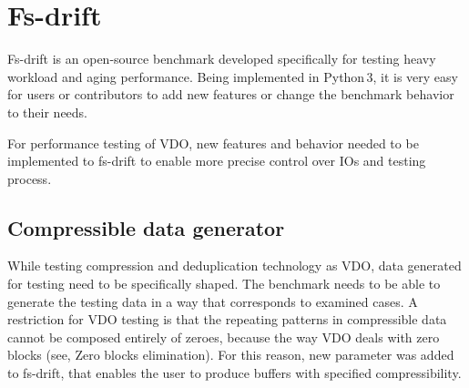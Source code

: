 \documentclass[
  color, %
  table, %
  lof,   %
  lot,   %
]{fithesis3}
\begin{document}



\chapter{Fs-drift}
\label{fs-drift}

Fs-drift is an open-source benchmark developed specifically for testing heavy workload and aging performance. Being implemented in Python\,3, it is very easy for users or contributors to add new features or change the benchmark behavior to their needs.

For performance testing of VDO, new features and behavior needed to be implemented to fs-drift to enable more precise control over IOs and testing process.

\section{Compressible data generator}
While testing compression and deduplication technology as VDO, data generated for testing need to be specifically shaped. The benchmark needs to be able to generate the testing data in a way that corresponds to examined cases. A restriction for VDO testing is that the repeating patterns in compressible data cannot be composed entirely of zeroes, because the way VDO deals with zero blocks (see, Zero blocks elimination). For this reason, new parameter was added to fs-drift, that enables the user to produce buffers with specified compressibility.
\end{document}
